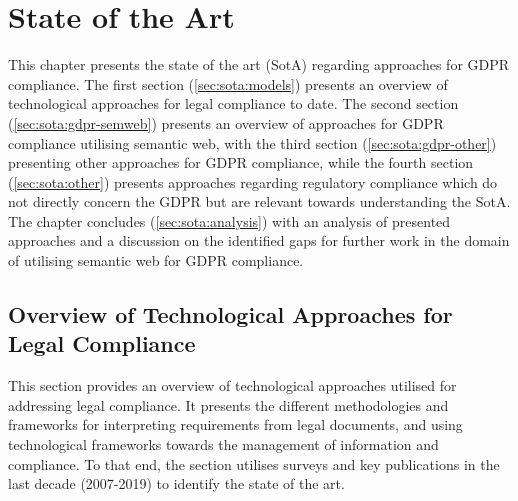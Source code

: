 \chapter{State of the Art}\label{chapter:sota}
This chapter presents the state of the art (SotA) regarding approaches for GDPR compliance.
The first section (\autoref{sec:sota:models}) presents an overview of technological approaches for legal compliance to date.
The second section (\autoref{sec:sota:gdpr-semweb}) presents an overview of approaches for GDPR compliance utilising semantic web, with the third section (\autoref{sec:sota:gdpr-other}) presenting other approaches for GDPR compliance,
while the fourth section (\autoref{sec:sota:other}) presents approaches regarding regulatory compliance which do not directly concern the GDPR but are relevant towards understanding the SotA.
The chapter concludes (\autoref{sec:sota:analysis}) with an analysis of presented approaches and a discussion on the identified gaps for further work in the domain of utilising semantic web for GDPR compliance.

\section{Overview of Technological Approaches for Legal Compliance}\label{sec:sota:models}
This section provides an overview of technological approaches utilised for addressing legal compliance. It presents the different methodologies and frameworks for interpreting requirements from legal documents, and using technological frameworks towards the management of information and compliance.
To that end, the section utilises surveys and key publications in the last decade (2007-2019) to identify the state of the art.

\cite{otto_addressing_2007} 

